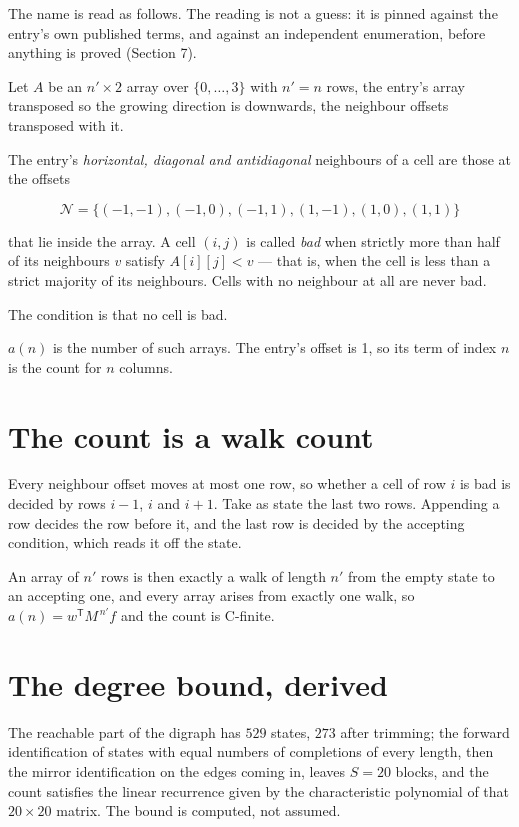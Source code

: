 \documentclass[11pt]{article}
\theoremstyle{definition}
\begin{document}
The name is read as follows. The reading is not a guess: it is pinned against the entry's own published terms, and against an independent enumeration, before anything is proved (Section 7).

Let $A$ be an $n' \times 2$ array over $\{0,\dots,3\}$ with $n' = n$ rows, the entry's array transposed so the growing direction is downwards, the neighbour offsets transposed with it.

The entry's {\itshape horizontal, diagonal and antidiagonal} neighbours of a cell are those at the offsets

\[\mathcal{N} = \{(-1,-1), (-1,0), (-1,1), (1,-1), (1,0), (1,1)\}\]

that lie inside the array. A cell $(i,j)$ is called {\itshape bad} when strictly more than half of its neighbours $v$ satisfy $A[i][j] < v$ --- that is, when the cell is less than a strict majority of its neighbours. Cells with no neighbour at all are never bad.

The condition is that no cell is bad.

$a(n)$ is the number of such arrays. The entry's offset is 1, so its term of index $n$ is the count for $n$ columns.

\section{The count is a walk count}

Every neighbour offset moves at most one row, so whether a cell of row $i$ is bad is decided by rows $i-1$, $i$ and $i+1$. Take as state the last two rows. Appending a row decides the row before it, and the last row is decided by the accepting condition, which reads it off the state.

An array of $n'$ rows is then exactly a walk of length $n'$ from the empty state to an accepting one, and every array arises from exactly one walk, so $a(n) = w^{\mathsf T}M^{\,n'}f$ and the count is C-finite.

\section{The degree bound, derived}

The reachable part of the digraph has $529$ states, $273$ after trimming; the forward identification of states with equal numbers of completions of every length, then the mirror identification on the edges coming in, leaves $S = 20$ blocks, and the count satisfies the linear recurrence given by the characteristic polynomial of that $20\times20$ matrix. The bound is computed, not assumed.
\end{document}
